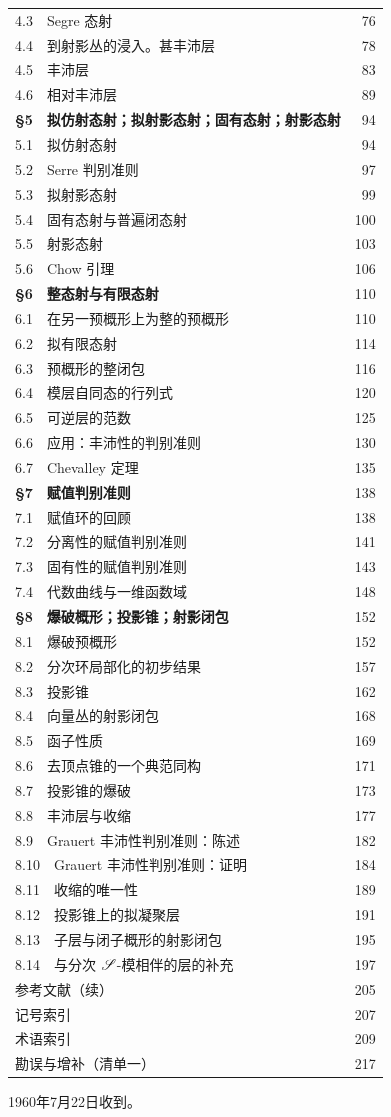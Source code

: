\begin{longtable}{@{}p{}@{\hspace{1em}}r@{}}
4.3　Segre 态射&76\\
4.4　到射影丛的浸入。甚丰沛层&78\\
4.5　丰沛层&83\\
4.6　相对丰沛层&89\\
\textbf{§5　拟仿射态射；拟射影态射；固有态射；射影态射}&94\\
5.1　拟仿射态射&94\\
5.2　Serre 判别准则&97\\
5.3　拟射影态射&99\\
5.4　固有态射与普遍闭态射&100\\
5.5　射影态射&103\\
5.6　Chow 引理&106\\
\textbf{§6　整态射与有限态射}&110\\
6.1　在另一预概形上为整的预概形&110\\
6.2　拟有限态射&114\\
6.3　预概形的整闭包&116\\
6.4　模层自同态的行列式&120\\
6.5　可逆层的范数&125\\
6.6　应用：丰沛性的判别准则&130\\
6.7　Chevalley 定理&135\\
\textbf{§7　赋值判别准则}&138\\
7.1　赋值环的回顾&138\\
7.2　分离性的赋值判别准则&141\\
7.3　固有性的赋值判别准则&143\\
7.4　代数曲线与一维函数域&148\\
\textbf{§8　爆破概形；投影锥；射影闭包}&152\\
8.1　爆破预概形&152\\
8.2　分次环局部化的初步结果&157\\
8.3　投影锥&162\\
8.4　向量丛的射影闭包&168\\
8.5　函子性质&169\\
8.6　去顶点锥的一个典范同构&171\\
8.7　投影锥的爆破&173\\
8.8　丰沛层与收缩&177\\
8.9　Grauert 丰沛性判别准则：陈述&182\\
8.10　Grauert 丰沛性判别准则：证明&184\\
8.11　收缩的唯一性&189\\
8.12　投影锥上的拟凝聚层&191\\
8.13　子层与闭子概形的射影闭包&195\\
8.14　与分次 $\mathscr S$-模相伴的层的补充&197\\
参考文献（续）&205\\
记号索引&207\\
术语索引&209\\
勘误与增补（清单一）&217\\
\end{longtable}\endgroup
\begin{flushright}1960年7月22日收到。\end{flushright}

